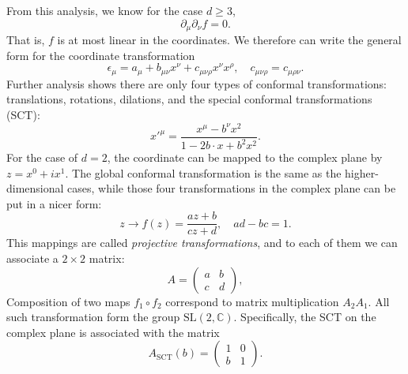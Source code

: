 \documentclass[aps,prb,superscriptaddress,nofootinbib]{revtex4}
\begin{document}
From this analysis, we know for the case $d \ge 3$, 
\begin{equation}
	\partial_\mu\partial_\nu f = 0.
\end{equation}
That is, $f$ is at most linear in the coordinates.
We therefore can write the general form for the coordinate transformation
\begin{equation}
	\epsilon_\mu = a_\mu + b_{\mu\nu} x^\nu + c_{\mu\nu\rho} x^\nu x^\rho, \quad c_{\mu\nu\rho} = c_{\mu\rho\nu}.
\end{equation}
Further analysis shows there are only four types of conformal transformations: translations, rotations, dilations, and the special conformal transformations (SCT):
\begin{equation}
	{x'}^\mu = \frac{x^\mu - b^\nu x^2}{1- 2 b\cdot x +b^2 x^2}.
\end{equation}
For the case of $d=2$, the coordinate can be mapped to the complex plane by $z = x^0 + i x^1$.
The global conformal transformation is the same as the higher-dimensional cases, while those four transformations in the complex plane can be put in a nicer form:
\begin{equation}
	z \rightarrow f(z) = \frac{a z + b}{c z + d},\quad ad-bc = 1.
\end{equation}
This mappings are called \textit{projective transformations}, and to each of them we can associate a $2\times2$ matrix:
\begin{equation}
	A = \begin{pmatrix}
		a & b \\ c & d
	\end{pmatrix},
\end{equation}
Composition of two maps $f_1 \circ f_2$ correspond to matrix multiplication $A_2 A_1$.
All such transformation form the group $\mathrm{SL}(2, \mathbb C)$.
Specifically, the SCT on the complex plane is associated with the matrix
\begin{equation}
	A_{\mathrm{SCT}}(b) = \begin{pmatrix}
		1 & 0 \\ b & 1
	\end{pmatrix}.
\end{equation}
\end{document}

